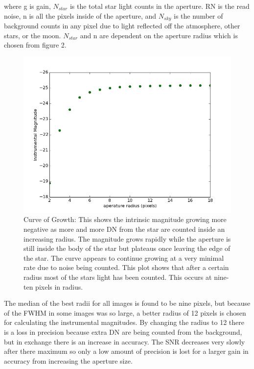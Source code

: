 \documentclass[12 pt,twoside]{article}
\begin{document}
\noindent where g is gain, $N_{star}$ is the total star light counts in the aperture. RN is the read noise, n is all the pixels inside of the aperture, and $N_{sky}$ is the number of background counts in any pixel due to light reflected off the atmosphere, other stars, or the moon. $N_{star}$ and n are dependent on the aperture radius which is chosen from figure 2.

\begin{center}
\begin{figure}[!hb]
\includegraphics[scale=0.5]{figure_2.png}
\caption{\small Curve of Growth: This shows the intrinsic magnitude growing more negative as more and more DN from the star are counted inside an increasing radius. The magnitude grows rapidly while the aperture is still inside the body of the star but plateaus once leaving the edge of the star. The curve appears to continue growing at a very minimal rate due to noise being counted. This plot shows that after a certain radius most of the stars light has been counted. This occurs at nine-ten pixels in radius. }
\end{figure}
\end{center}

The median of the best radii for all images is found to be nine pixels, but because of the FWHM in some images was so large, a better radius of 12 pixels is chosen for calculating the instrumental magnitudes. By changing the radius to 12 there is a loss in precision because extra DN are being counted from the background, but in exchange there is an increase in accuracy. The SNR decreases very slowly after there maximum so only a low amount of precision is lost for a larger gain in accuracy from increasing the aperture size. 
\end{document}
